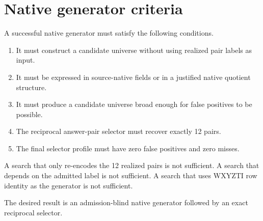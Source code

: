 \section{Native generator criteria}

A successful native generator must satisfy the following conditions.

\begin{enumerate}[leftmargin=2em]
\item It must construct a candidate universe without using realized pair labels as input.
\item It must be expressed in source-native fields or in a justified native quotient structure.
\item It must produce a candidate universe broad enough for false positives to be possible.
\item The reciprocal answer-pair selector must recover exactly 12 pairs.
\item The final selector profile must have zero false positives and zero misses.
\end{enumerate}

A search that only re-encodes the 12 realized pairs is not sufficient. A search that depends on the admitted label is not sufficient. A search that uses WXYZTI row identity as the generator is not sufficient.

The desired result is an admission-blind native generator followed by an exact reciprocal selector.
